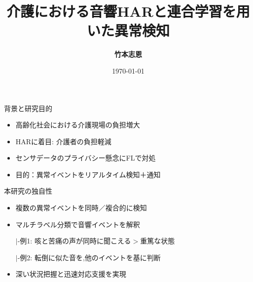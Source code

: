 \documentclass[unicode,12pt,aspectratio=169,dvipdfmx]{beamer}
\title{\textbf{介護における音響HARと連合学習を用いた異常検知}}
\author{\textbf{竹本志恩}}
\institute{\textbf{INIAD}}
\date{\today}
\begin{document}
\begin{frame}
  \titlepage
\end{frame}
\begin{frame}{背景と研究目的}
  \begin{itemize}
    \item 高齢化社会における介護現場の負担増大
    \item HARに着目: 介護者の負担軽減
    \item センサデータのプライバシー懸念にFLで対処
    \item 目的：異常イベントをリアルタイム検知＋通知
  \end{itemize}
\end{frame}
\begin{frame}{本研究の独自性}
  \begin{itemize}
    \item 複数の異常イベントを同時／複合的に検知
    \item マルチラベル分類で音響イベントを解釈
    
    $|$-例1: 咳と苦痛の声が同時に聞こえる$>$重篤な状態
    
    $|$-例2: 転倒に似た音を,他のイベントを基に判断
    \item 深い状況把握と迅速対応支援を実現
  \end{itemize}
\end{frame}
\end{document}
